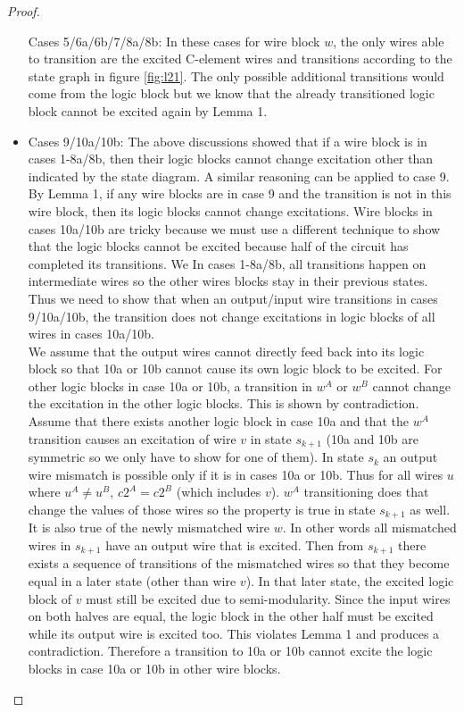 \documentclass[12pt]{report}
\begin{document}
\begin{proof}
\begin{itemize}
Cases 5/6a/6b/7/8a/8b:  In these cases for wire block $w$, the only wires able to transition are the excited C-element wires and transitions according to the state graph in figure \ref{fig:l21}.  The only possible additional transitions would come from the logic block but we know that the already transitioned logic block cannot be excited again by Lemma 1.
\item
Cases 9/10a/10b:  The above discussions showed that if a wire block is in cases 1-8a/8b, then their logic blocks cannot change excitation other than indicated by the state diagram.  A similar reasoning can be applied to case 9.  By Lemma 1, if any wire blocks are in case 9 and the transition is not in this wire block, then its logic blocks cannot change excitations.  Wire blocks in cases 10a/10b are tricky because we must use a different technique to show that the logic blocks cannot be excited because half of the circuit has completed its transitions.  %
We   In cases 1-8a/8b, all transitions happen on intermediate wires so the other wires blocks stay in their previous states.  
Thus we need to show that when an output/input wire transitions in cases 9/10a/10b, the transition does not change excitations in logic blocks of all wires in cases 10a/10b. \\  
We assume that the output wires cannot directly feed back into its logic block so that 10a or 10b cannot cause its own logic block to be excited.  For other logic blocks in case 10a or 10b, a transition in $w^A$ or $w^B$ cannot change the excitation in the other logic blocks.  This is shown by contradiction.  
Assume that there exists another logic block in case 10a and that the $w^A$ transition causes an excitation of wire $v$ in state $s_{k+1}$ (10a and 10b are symmetric so we only have to show for one of them).  In state $s_k$ an output wire mismatch is possible only if it is in cases 10a or 10b.  Thus for all wires $u$ where $u^A\neq u^B$, $c2^A=c2^B$ (which includes $v$).  $w^A$ transitioning does that change the values of those wires so the property is true in state $s_{k+1}$ as well.  It is also true of the newly mismatched wire $w$.  In other words all mismatched wires in $s_{k+1}$ have an output wire that is excited. Then from $s_{k+1}$ there exists a sequence of transitions of the mismatched wires so that they become equal in a later state (other than wire $v$).  In that later state, the excited logic block of $v$ must still be excited due to semi-modularity.  Since the input wires on both halves are equal, the logic block in the other half must be excited while its output wire is excited too.  This violates Lemma 1 and produces a contradiction.  Therefore a transition to 10a or 10b cannot excite the logic blocks in case 10a or 10b in other wire blocks.\\

\end{itemize}
\end{proof}
\end{document}
